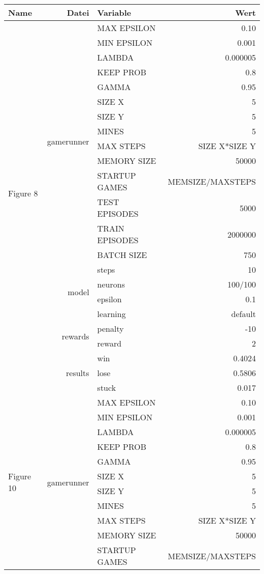 \documentclass[9pt]{article}
\begin{document}
\begin{tabularx}{\textwidth}{l|r|X|r}
	Name & Datei & Variable & Wert \\
	\hline
	\multirow{21}{*}{Figure 8} & \multirow{14}{*}{gamerunner} & MAX EPSILON	& 0.10\\
	& & MIN EPSILON	& 0.001 \\
	& & LAMBDA & 0.000005 \\
	& & KEEP PROB & 0.8 \\
	& & GAMMA	& 0.95 \\
	& & SIZE X & 5 \\
	& & SIZE Y & 5 \\
	& & MINES & 5 \\
	& & MAX STEPS & SIZE X*SIZE Y\\
	& & MEMORY SIZE & 50000 \\
	& & STARTUP GAMES & MEMSIZE/MAXSTEPS \\
	& & TEST EPISODES & 5000 \\
	& & TRAIN EPISODES & 2000000 \\
	& & BATCH SIZE & 750 \\
	& & steps & 10\\\cline{2-4}
	& \multirow{2}{*}{model} & neurons & 100/100 \\ 
	& & epsilon & 0.1\\
	& & learning & default \\\cline{2-4}
	& \multirow{2}{*}{rewards} & penalty & -10\\
	& & reward & 2\\\cline{2-4}
	& \multirow{3}{*}{results} & win & 0.4024\\
	& & lose & 0.5806\\
	& & stuck & 0.017\\
	\hline
	\hline
	\multirow{21}{*}{Figure 10} & \multirow{14}{*}{gamerunner} & MAX EPSILON	& 0.10\\
	& & MIN EPSILON	& 0.001 \\
	& & LAMBDA & 0.000005 \\
	& & KEEP PROB & 0.8 \\
	& & GAMMA	& 0.95 \\
	& & SIZE X & 5 \\
	& & SIZE Y & 5 \\
	& & MINES & 5 \\
	& & MAX STEPS & SIZE X*SIZE Y\\
	& & MEMORY SIZE & 50000 \\
	& & STARTUP GAMES & MEMSIZE/MAXSTEPS \\

\end{tabularx}
\end{document}
